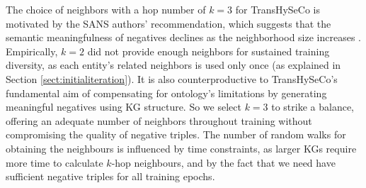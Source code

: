 \documentclass[sigconf]{acmart}
\newcommand{\TransHI}{TransHySeCo\xspace}
\begin{document}
The choice of neighbors with a hop number of $k = 3$ for \TransHI
is  motivated by the SANS authors' recommendation, which suggests that the semantic meaningfulness of negatives declines as the neighborhood size increases \cite{sanspaper}. Empirically, $k = 2$ did not provide enough neighbors for sustained training diversity, as each entity's related neighbors is used only once (as explained in Section \ref{sect:initialiteration}).  It is also counterproductive to \TransHI's fundamental aim of compensating for ontology's limitations by generating meaningful negatives using KG structure.
So we select $k = 3$ %
to strike a balance, offering an adequate number of neighbors throughout training without compromising the quality of   negative triples. The number of random walks for  obtaining the neighbours is influenced by time constraints, as larger KGs require more time to calculate $k$-hop neighbours, and by the fact that we need have sufficient negative triples %
for all training epochs.
\end{document}
